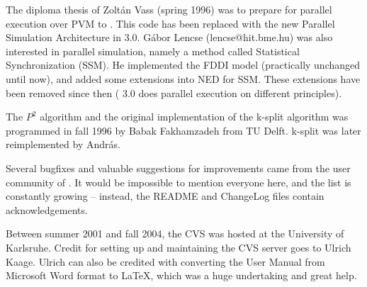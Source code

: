 The diploma thesis of Zolt\'{a}n Vass (spring 1996) was to prepare
{\omnetpp} for parallel execution over PVM to {\omnetpp}. This code has been
replaced with the new Parallel Simulation Architecture in {\omnetpp} 3.0.
G\'{a}bor Lencse (lencse@hit.bme.hu) was also interested in parallel
simulation, namely a method called Statistical Synchronization (SSM).
He implemented the FDDI model (practically unchanged until now), and added
some extensions into NED for SSM. These extensions have been removed
since then ({\omnetpp} 3.0 does parallel execution on different principles).

The $P^{2}$ algorithm and the original implementation of the k-split algorithm
was programmed in fall 1996 by Babak Fakhamzadeh from TU Delft.
k-split was later reimplemented by Andr\'{a}s.

Several bugfixes and valuable suggestions for improvements came
from the user community of {\omnetpp}. It would be impossible to
mention everyone here, and the list is constantly growing --
instead, the README and ChangeLog files contain acknowledgements.

Between summer 2001 and fall 2004, the {\omnetpp} CVS was hosted
at the University of Karlsruhe. Credit for setting
up and maintaining the CVS server goes to Ulrich Kaage.
Ulrich can also be credited with converting the User Manual from
Microsoft Word format to LaTeX, which was a huge undertaking
and great help.



